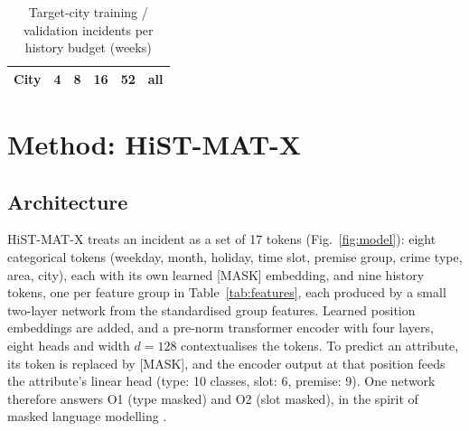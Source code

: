 \documentclass[11pt]{article}
\newcommand{\HMX}{HiST-MAT-X}
\begin{document}
\begin{table}[!htbp]
\centering
\caption{Target-city training / validation incidents per history budget (weeks)}
\label{tab:splits}
\small
\begin{tabular}{lccccc}
\toprule
City & 4 & 8 & 16 & 52 & all \\
\midrule

\bottomrule
\end{tabular}
\end{table}

\section{Method: \HMX{}}\label{sec:method}

\subsection{Architecture}
\HMX{} treats an incident as a set of 17 tokens (Fig.~\ref{fig:model}): eight categorical tokens (weekday, month, holiday, time slot, premise group, crime type, area, city), each with its own learned [MASK] embedding, and nine history tokens, one per feature group in Table~\ref{tab:features}, each produced by a small two-layer network from the standardised group features. Learned position embeddings are added, and a pre-norm transformer encoder \citep{vaswani2017} with four layers, eight heads and width $d=128$ contextualises the tokens. To predict an attribute, its token is replaced by [MASK], and the encoder output at that position feeds the attribute's linear head (type: 10 classes, slot: 6, premise: 9). One network therefore answers O1 (type masked) and O2 (slot masked), in the spirit of masked language modelling \citep{devlin2019}.
\end{document}
